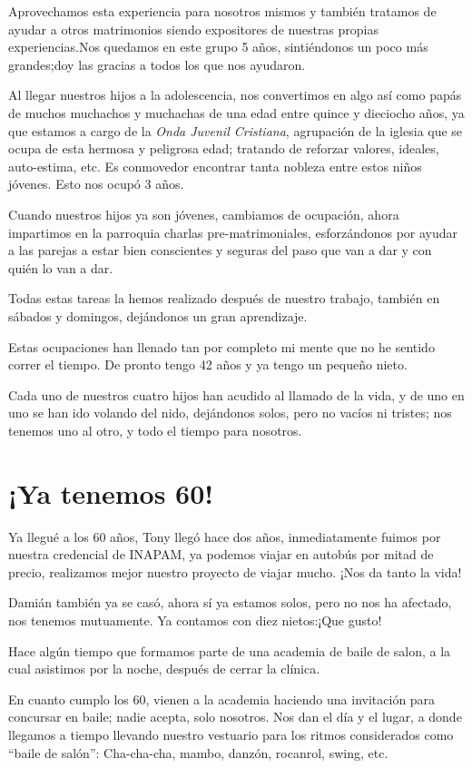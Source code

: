 \documentclass[letterpaper, 12pt]{book}
\begin{document}
Aprovechamos esta experiencia para nosotros mismos y también tratamos de ayudar a otros matrimonios siendo expositores de nuestras propias experiencias.Nos quedamos en este grupo 5 años, sintiéndonos un poco más grandes;doy las gracias a todos los que nos ayudaron.

Al llegar nuestros hijos a la adolescencia, nos convertimos en algo así como papás de muchos muchachos y muchachas de una edad entre quince y dieciocho años, ya que estamos a cargo de la \textit{Onda Juvenil Cristiana}, agrupación de la iglesia que se ocupa de esta hermosa y peligrosa edad; tratando de reforzar valores, ideales, auto-estima, etc. Es conmovedor encontrar tanta nobleza entre estos niños jóvenes. Esto nos ocupó 3 años.

Cuando nuestros hijos ya son jóvenes, cambiamos de ocupación, ahora impartimos en la parroquia charlas pre-matrimoniales, esforzándonos por ayudar a las parejas a estar bien conscientes y seguras del paso que van a dar y con quién lo van a dar.

Todas estas tareas la hemos realizado después de nuestro trabajo, también en sábados y domingos, dejándonos un gran aprendizaje.

Estas ocupaciones han llenado tan por completo mi mente que no he sentido correr el tiempo. De pronto tengo 42 años y ya tengo un pequeño nieto.

Cada uno de nuestros cuatro hijos han acudido al llamado de la vida, y de uno en uno se han ido volando del nido, dejándonos solos, pero no vacíos ni tristes; nos tenemos uno al otro, y todo el tiempo para nosotros.

\chapter{¡Ya tenemos 60!}
Ya llegué a los 60 años, Tony llegó hace dos años, inmediatamente fuimos por nuestra credencial de INAPAM, ya podemos viajar en autobús por mitad de precio, realizamos mejor nuestro proyecto de viajar mucho. ¡Nos da tanto la vida!

Damián también ya se casó, ahora sí ya estamos solos, pero no nos ha afectado, nos tenemos mutuamente. Ya contamos con diez nietos:¡Que gusto!  

Hace algún tiempo que formamos parte de una academia de baile de salon, a la cual asistimos por la noche, después de cerrar la clínica.

En cuanto cumplo los 60, vienen a la academia haciendo una invitación para concursar en baile; nadie acepta, solo nosotros. Nos dan el día y el lugar, a donde llegamos a tiempo llevando nuestro vestuario para los ritmos considerados como ``baile de salón'': Cha-cha-cha, mambo, danzón, rocanrol, swing, etc.
\end{document}
